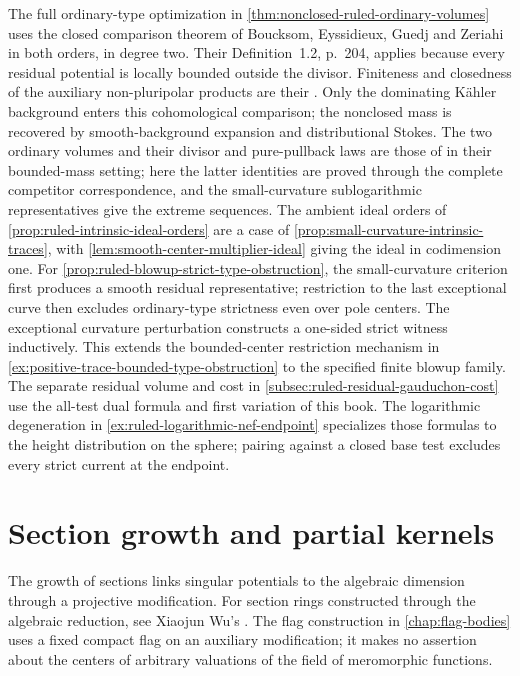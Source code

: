 The full ordinary-type optimization in \cref{thm:nonclosed-ruled-ordinary-volumes} uses the closed comparison theorem of Boucksom, Eyssidieux, Guedj and Zeriahi \cite[Theorem~1.16, pp.~217--218]{BEGZ10} in both orders, in degree two. Their Definition~1.2, p.~204, applies because every residual potential is locally bounded outside the divisor. Finiteness and closedness of the auxiliary non-pluripolar products are their \cite[Proposition~1.6 and Theorem~1.8, pp.~206--209]{BEGZ10}. Only the dominating K\"ahler background enters this cohomological comparison; the nonclosed mass is recovered by smooth-background expansion and distributional Stokes. The two ordinary volumes and their divisor and pure-pullback laws are those of \cite[Definition~3.1 and Proposition~3.3]{BGL25} in their bounded-mass setting; here the latter identities are proved through the complete competitor correspondence, and the small-curvature sublogarithmic representatives give the extreme sequences. The ambient ideal orders of \cref{prop:ruled-intrinsic-ideal-orders} are a case of \cref{prop:small-curvature-intrinsic-traces}, with \cref{lem:smooth-center-multiplier-ideal} giving the ideal in codimension one. For \cref{prop:ruled-blowup-strict-type-obstruction}, the small-curvature criterion first produces a smooth residual representative; restriction to the last exceptional curve then excludes ordinary-type strictness even over pole centers. The exceptional curvature perturbation constructs a one-sided strict witness inductively. This extends the bounded-center restriction mechanism in \cref{ex:positive-trace-bounded-type-obstruction} to the specified finite blowup family. The separate residual volume and cost in \cref{subsec:ruled-residual-gauduchon-cost} use the all-test dual formula and first variation of this book. The logarithmic degeneration in \cref{ex:ruled-logarithmic-nef-endpoint} specializes those formulas to the height distribution on the sphere; pairing against a closed base test excludes every strict current at the endpoint.

\section{Section growth and partial kernels}
\label{sec:history-sections}

The growth of sections links singular potentials to the algebraic dimension through a projective modification. For section rings constructed through the algebraic reduction, see Xiaojun Wu's \cite{Wu24}. The flag construction in \cref{chap:flag-bodies} uses a fixed compact flag on an auxiliary modification; it makes no assertion about the centers of arbitrary valuations of the field of meromorphic functions.


